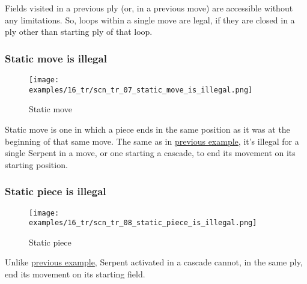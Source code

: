 Fields visited in a previous ply (or, in a previous move) are accessible
without any limitations. So, loops within a single move are legal, if they
are closed in a ply other than starting ply of that loop.

\clearpage %

\subsubsection*{Static move is illegal}
\label{sec:Tamoanchan Revisited/Serpent/Movement/Static move is illegal}

\vspace*{-0.7\baselineskip}
\noindent
\begin{wrapfigure}[8]{l}{0.4\textwidth}
\centering
\texttt{[image: examples/16\_tr/scn\_tr\_07\_static\_move\_is\_illegal.png]}
\caption{Static move}
\label{fig:scn_tr_07_static_move_is_illegal}
\end{wrapfigure}
Static move is one in which a piece ends in the same position as it was at the
beginning of that same move. The same as in
\hyperref[fig:scn_mv_53_static_move_is_illegal_init]{previous example}, it's
illegal for a single Serpent in a move, or one starting a cascade, to end its
movement on its starting position.


\vspace*{1.7\baselineskip}
\subsubsection*{Static piece is illegal}
\label{sec:Tamoanchan Revisited/Serpent/Movement/Static piece is illegal}

\vspace*{-0.7\baselineskip}
\noindent
\begin{wrapfigure}[9]{l}{0.4\textwidth}
\centering
\texttt{[image: examples/16\_tr/scn\_tr\_08\_static\_piece\_is\_illegal.png]}
\caption{Static piece}
\label{fig:scn_tr_08_static_piece_is_illegal}
\end{wrapfigure}
Unlike
\hyperref[fig:scn_mv_55_static_piece_is_legal_init]{previous example}, Serpent
activated in a cascade cannot, in the same ply, end its movement on its starting
field.


